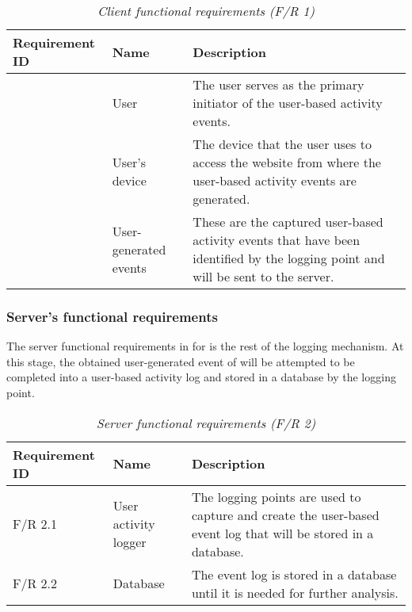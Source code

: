 \begin{table}[!htb]
	\centering
	\caption[Client functional requirements]
	{\textit{Client functional requirements (F/R 1)}}
	\label{tbl:ch2_clientFunctionalRequirements}
	\begin{tabularx}{\textwidth}{|l|l|X|}
		\hline \textbf{Requirement ID} & \textbf{Name} & \textbf{Description} \\
		\hline \subphase{}\label{fr:1_1_User} & User & The user serves as the primary initiator of the user-based activity events.\\
		\hline \subphase{} & User's device & The device that the user uses to access the website from where the user-based activity events are generated.\\
		\hline \subphase{} & User-generated events & These are the captured user-based activity events that have been identified by the logging point and will be sent to the server.\\
		\hline
	\end{tabularx}
\end{table}

\subsubsection{Server's functional requirements}\label{sec:ch2_serverFunctionalRequirements}
The server functional requirements in  for  is the rest of the logging mechanism. At this stage, the obtained user-generated event of  will be attempted to be completed into a user-based activity log and stored in a database by the logging point. \par 

\begin{table}[!htb]
	\centering
	\caption[Server functional requirements]
	{\textit{Server functional requirements (F/R 2)}}
	\label{tbl:ch2_serverInterfaceRequirements}
	\begin{tabularx}{\textwidth}{|l|l|X|}
		\hline \textbf{Requirement ID} & \textbf{Name} & \textbf{Description} \\
		\hline F/R 2.1 & User activity logger & The logging points are used to capture and create the user-based event log that will be stored in a database.\\
		\hline F/R 2.2 & Database & The event log is stored in a database until it is needed for further analysis.\\
		\hline
	\end{tabularx}
\end{table}


